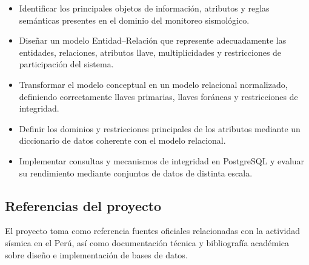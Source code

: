 \documentclass[12pt,a4paper]{article}
\begin{document}
\begin{itemize}
    \item Identificar los principales objetos de información, atributos y reglas semánticas presentes en el dominio del monitoreo sismológico.

    \item Diseñar un modelo Entidad--Relación que represente adecuadamente las entidades, relaciones, atributos llave, multiplicidades y restricciones de participación del sistema.

    \item Transformar el modelo conceptual en un modelo relacional normalizado, definiendo correctamente llaves primarias, llaves foráneas y restricciones de integridad.

    \item Definir los dominios y restricciones principales de los atributos mediante un diccionario de datos coherente con el modelo relacional.

    \item Implementar consultas y mecanismos de integridad en PostgreSQL y evaluar su rendimiento mediante conjuntos de datos de distinta escala.
\end{itemize}


\subsection{Referencias del proyecto}

El proyecto toma como referencia fuentes oficiales relacionadas con la actividad sísmica en el Perú, así como documentación técnica y bibliografía académica sobre diseño e implementación de bases de datos.
\end{document}
